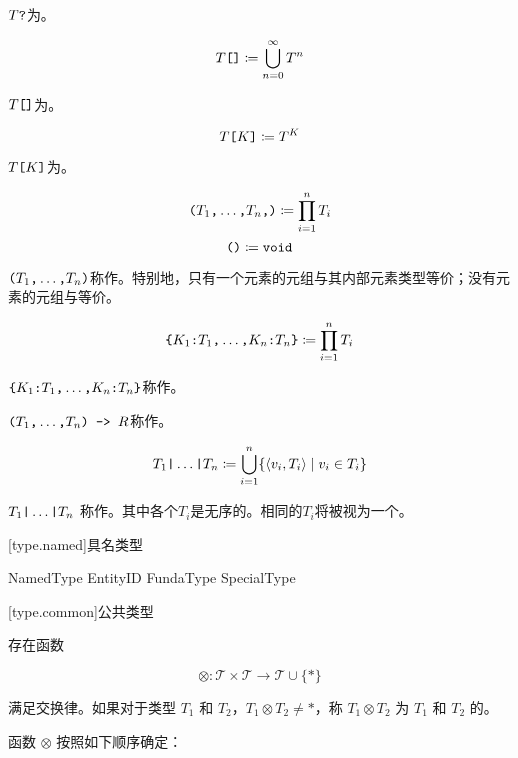 \pnum
$T\texttt{?}$为。

$$ T\texttt{[]} \coloneqq \bigcup^\infty_{n=0} T^n $$

\pnum
$T\texttt{[]}$为。

$$ T\texttt{[}K\texttt{]} \coloneqq T^K $$

\pnum
$T\texttt{[}K\texttt{]}$为。

$$ \texttt{(}T_1\texttt{,} \ldots\texttt{,} T_n\texttt{,}\texttt{)} \coloneqq \prod^n_{i=1} T_i $$
$$ \texttt{()} \coloneqq \texttt{void} $$

\pnum
$\texttt{(}T_1\texttt{,} \ldots\texttt{,} T_n\texttt{)}$称作。特别地，只有一个元素的元组与其内部元素类型等价；没有元素的元组与等价。

$$ \texttt{\{} K_1\texttt{:}T_1\texttt{,} \ldots\texttt{,} K_n\texttt{:}T_n \texttt{\}} \coloneqq \prod^n_{i=1} T_i $$

\pnum
$\texttt{\{}K_1\texttt{:}T_1\texttt{,} \ldots\texttt{,} K_n\texttt{:}T_n\texttt{\}}$称作。

\pnum
$\texttt{(}T_1\texttt{,} \ldots\texttt{,} T_n\texttt{) -> }R$称作。

$$ T_1 \texttt{|} \ldots \texttt{|} T_n \coloneqq \bigcup^n_{i=1} \{ \langle v_i, T_i \rangle \mid v_i \in T_i \} $$

\pnum
$T_1\texttt{|}\ldots\texttt{|}T_n$ 称作。其中各个$T_i$是无序的。相同的$T_i$将被视为一个。

[type.named]{具名类型}

\begin{bnf}{NamedType}
    EntityID \br
    FundaType \br
    SpecialType
\end{bnf}

[type.common]{公共类型}

\pnum
存在函数

$$ \otimes: \mathcal{T} \times \mathcal{T} \rightarrow \mathcal{T} \cup \{ \ast \} $$

满足交换律。如果对于类型 $T_1$ 和 $T_2$，$T_1 \otimes T_2 \ne \ast$，称 $T_1 \otimes T_2$ 为 $T_1$ 和 $T_2$ 的。

\pnum
函数 $\otimes$ 按照如下顺序确定：


